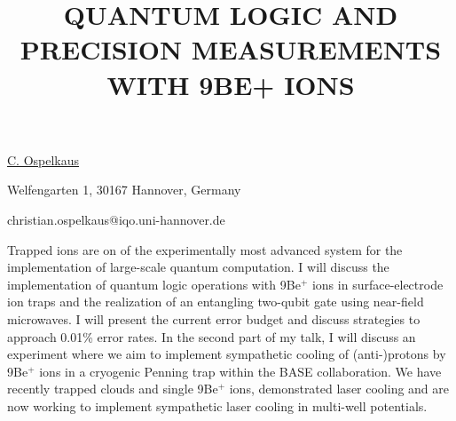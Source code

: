 \title{QUANTUM LOGIC AND PRECISION MEASUREMENTS WITH 9BE+ IONS}

\underline{C. Ospelkaus}  

{\normalsize{\vspace{-4mm}
Welfengarten 1,
30167 Hannover,
Germany



\email christian.ospelkaus@iqo.uni-hannover.de}}

Trapped ions are on of the experimentally most advanced system for the implementation of large-scale quantum computation. I will discuss the implementation of quantum logic operations with 9Be$^+$ ions in surface-electrode ion traps and the realization of an entangling two-qubit gate using near-field microwaves. I will present the current error budget and discuss strategies to approach 0.01\% error rates. In the second part of my talk, I will discuss an experiment where we aim to implement sympathetic cooling of (anti-)protons by 9Be$^+$ ions in a cryogenic Penning trap within the BASE collaboration. We have recently trapped clouds and single 9Be$^+$ ions, demonstrated laser cooling and are now working to implement sympathetic laser cooling in multi-well potentials. 

\vspace{\baselineskip}
